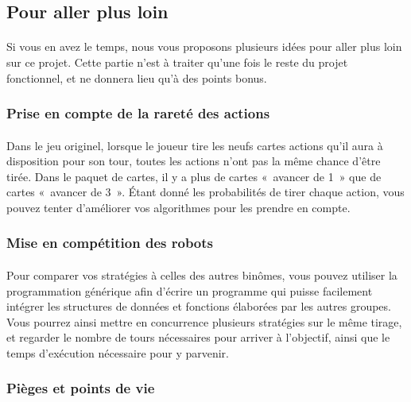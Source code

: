\documentclass[a4paper]{article}
\begin{document}
\subsection{Pour aller plus loin}

\paragraph{}Si vous en avez le temps, nous vous proposons plusieurs idées pour
aller plus loin sur ce projet. Cette partie n'est à traiter qu'une fois le reste
du projet fonctionnel, et ne donnera lieu qu'à des points bonus.

\subsubsection{Prise en compte de la rareté des actions}

\paragraph{}Dans le jeu originel, lorsque le joueur tire les neufs cartes
actions qu'il aura à disposition pour son tour, toutes les actions n'ont pas la
même chance d'être tirée. Dans le paquet de cartes, il y a plus de cartes
«~avancer de 1~» que de cartes «~avancer de 3~». Étant donné les probabilités de
tirer chaque action, vous pouvez tenter d'améliorer vos algorithmes pour les
prendre en compte. 

\subsubsection{Mise en compétition des robots}

\paragraph{}Pour comparer vos stratégies à celles des autres binômes, vous
pouvez utiliser la programmation générique afin d'écrire un programme qui puisse
facilement intégrer les structures de données et fonctions élaborées par les
autres groupes. Vous pourrez ainsi mettre en concurrence plusieurs stratégies
sur le même tirage, et regarder le nombre de tours nécessaires pour arriver à
l'objectif, ainsi que le temps d'exécution nécessaire pour y parvenir.

\subsubsection{Pièges et points de vie}
\end{document}

